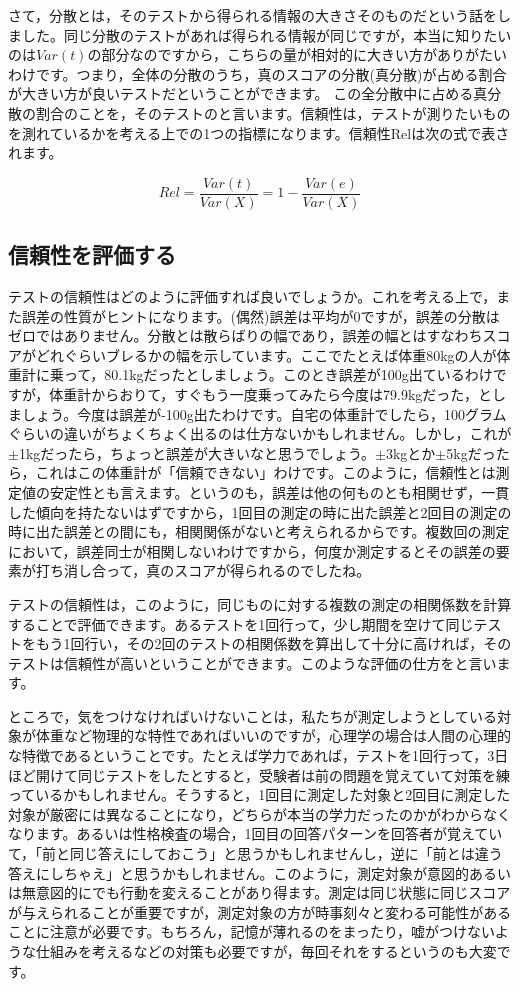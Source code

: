\documentclass{ltjbook}
\begin{document}
さて，分散とは，そのテストから得られる情報の大きさそのものだという話をしました。同じ分散のテストがあれば得られる情報が同じですが，本当に知りたいのは$Var(t)$の部分なのですから，こちらの量が相対的に大きい方がありがたいわけです。つまり，全体の分散のうち，真のスコアの分散(真分散)が占める割合が大きい方が良いテストだということができます。
この全分散中に占める真分散の割合のことを，そのテストのと言います。信頼性は，テストが測りたいものを測れているかを考える上での1つの指標になります。信頼性Relは次の式で表されます。

\[ Rel = \frac{Var(t)}{Var(X)} = 1 - \frac{Var(e)}{Var(X)} \]


\subsection{信頼性を評価する}
テストの信頼性はどのように評価すれば良いでしょうか。これを考える上で，また誤差の性質がヒントになります。(偶然)誤差は平均が$0$ですが，誤差の分散はゼロではありません。分散とは散らばりの幅であり，誤差の幅とはすなわちスコアがどれぐらいブレるかの幅を示しています。ここでたとえば体重80kgの人が体重計に乗って，80.1kgだったとしましょう。このとき誤差が100g出ているわけですが，体重計からおりて，すぐもう一度乗ってみたら今度は79.9kgだった，としましょう。今度は誤差が-100g出たわけです。自宅の体重計でしたら，100グラムぐらいの違いがちょくちょく出るのは仕方ないかもしれません。しかし，これが$\pm$1kgだったら，ちょっと誤差が大きいなと思うでしょう。$\pm$3kgとか$\pm$5kgだったら，これはこの体重計が「信頼できない」わけです。このように，信頼性とは測定値の安定性とも言えます。というのも，誤差は他の何ものとも相関せず，一貫した傾向を持たないはずですから，1回目の測定の時に出た誤差と2回目の測定の時に出た誤差との間にも，相関関係がないと考えられるからです。複数回の測定において，誤差同士が相関しないわけですから，何度か測定するとその誤差の要素が打ち消し合って，真のスコアが得られるのでしたね。

テストの信頼性は，このように，同じものに対する複数の測定の相関係数を計算することで評価できます。あるテストを1回行って，少し期間を空けて同じテストをもう1回行い，その2回のテストの相関係数を算出して十分に高ければ，そのテストは信頼性が高いということができます。このような評価の仕方をと言います。

ところで，気をつけなければいけないことは，私たちが測定しようとしている対象が体重など物理的な特性であればいいのですが，心理学の場合は人間の心理的な特徴であるということです。たとえば学力であれば，テストを1回行って，3日ほど開けて同じテストをしたとすると，受験者は前の問題を覚えていて対策を練っているかもしれません。そうすると，1回目に測定した対象と2回目に測定した対象が厳密には異なることになり，どちらが本当の学力だったのかがわからなくなります。あるいは性格検査の場合，1回目の回答パターンを回答者が覚えていて，「前と同じ答えにしておこう」と思うかもしれませんし，逆に「前とは違う答えにしちゃえ」と思うかもしれません。このように，測定対象が意図的あるいは無意図的にでも行動を変えることがあり得ます。測定は同じ状態に同じスコアが与えられることが重要ですが，測定対象の方が時事刻々と変わる可能性があることに注意が必要です。もちろん，記憶が薄れるのをまったり，嘘がつけないような仕組みを考えるなどの対策も必要ですが，毎回それをするというのも大変です。
\end{document}
